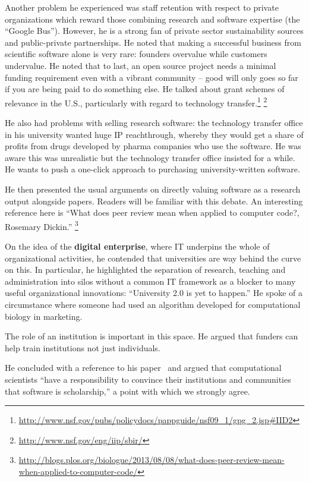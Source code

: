 \documentclass[11pt, oneside]{amsart}
\begin{document}
Another problem he experienced was staff retention with respect to
private organizations which reward those combining research and
software expertise (the ``Google Bus''). However, he is a strong fan
of private sector sustainability sources and public-private
partnerships. He noted that making a successful business from
scientific software alone is very rare: founders overvalue while
customers undervalue. He noted that to last, an open source project
needs a minimal funding requirement even with a vibrant community --
good will only goes so far if you are being paid to do something else.
He talked about grant schemes of relevance in the U.S., particularly
with regard to technology
transfer.\footnote{\url{http://www.nsf.gov/pubs/policydocs/pappguide/nsf09_1/gpg_2.jsp\#IID2}} \footnote{\url{http://www.nsf.gov/eng/iip/sbir/}}

He also had problems with selling research software: the technology
transfer office in his university wanted huge IP reachthrough, whereby
they would get a share of profits from drugs developed by pharma
companies who use the software. He was aware this was unrealistic but
the technology transfer office insisted for a while. He wants to push
a one-click approach to purchasing university-written software.

He then presented the usual arguments on directly valuing software as a
research output alongside papers. Readers will be familiar with this
debate. An interesting reference here is ``What
does peer review mean when applied to computer code?, Rosemary Dickin.''
\footnote{\url{http://blogs.plos.org/biologue/2013/08/08/what-does-peer-review-mean-when-applied-to-computer-code/}}

On the idea of the \textbf{digital enterprise}, where
IT underpins the whole of organizational activities, he contended that
universities are way behind the curve on this. In particular, he
highlighted the separation of research, teaching and administration into
silos without a common IT framework as a blocker to many useful
organizational innovations: ``University 2.0 is yet to happen.'' He
spoke of a circumstance where someone had used an algorithm developed
for computational biology in marketing.

The role of an institution is important in this space. He argued that
funders can help train institutions not just individuals.

He concluded with a reference to his paper~\cite{bourne_ten} and
argued that computational scientists ``have a responsibility to
convince their institutions and communities that software is
scholarship,'' a point with which we strongly agree.
\end{document}
